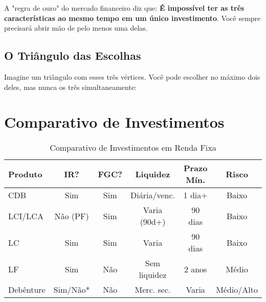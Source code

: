 \documentclass[
  12pt,
  a4paper,
  openright,
  oneside,
  chapter=TITLE,
  section=TITLE
]{abntex2}
\begin{document}
\vspace{0.5cm}
\noindent A "regra de ouro" do mercado financeiro diz que: \textbf{É impossível ter as três características ao mesmo tempo em um único investimento}. Você sempre precisará abrir mão de pelo menos uma delas.

\subsection{O Triângulo das Escolhas}

\noindent Imagine um triângulo com esses três vértices. Você pode escolher no máximo dois deles, mas nunca os três simultaneamente:

\begin{center}
\end{center}

\section{Comparativo de Investimentos}

\begin{table}[ht]
\centering
\begin{tabular}{|p{2cm}|c|c|c|c|c|}
\hline
\textbf{Produto} & \textbf{IR?} & \textbf{FGC?} & \textbf{Liquidez} & \textbf{Prazo Mín.} & \textbf{Risco} \\
\hline
CDB & Sim & Sim & Diária/venc. & 1 dia+ & Baixo \\
\hline
LCI/LCA & Não (PF) & Sim & Varia (90d+) & 90 dias & Baixo \\
\hline
LC & Sim & Sim & Varia & 90 dias & Baixo \\
\hline
LF & Sim & Não & Sem liquidez & 2 anos & Médio \\
\hline
Debênture & Sim/Não* & Não & Merc. sec. & Varia & Médio/Alto \\
\hline
\end{tabular}
\caption{Comparativo de Investimentos em Renda Fixa}
\label{tab:rendafixa}
\end{table}
\end{document}
